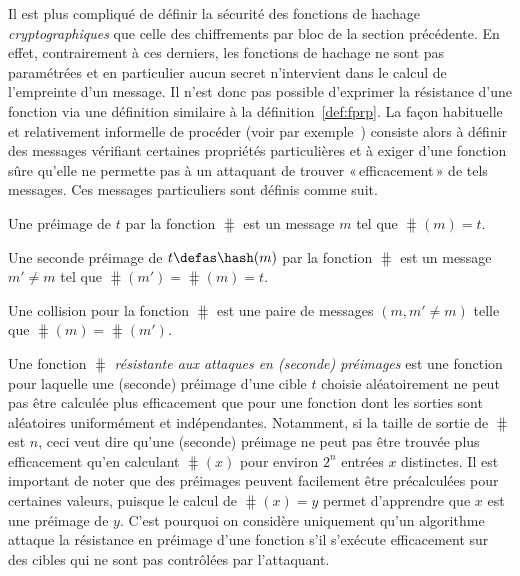 

Il est plus compliqué de définir la sécurité des fonctions de hachage \emph{cryptographiques} que celle des chiffrements par bloc de la section
précédente.
En effet, contrairement à ces derniers, les fonctions de hachage ne sont pas paramétrées et en particulier aucun secret n'intervient
dans le calcul de l'empreinte d'un message. Il n'est donc pas possible d'exprimer la résistance d'une fonction via une définition
similaire à la définition~\ref{def:fprp}. La façon habituelle et relativement informelle de procéder (voir par exemple~\cite[Chapitre 9]{HAC96})
consiste alors à définir des messages vérifiant certaines
propriétés particulières et à exiger d'une fonction sûre qu'elle ne permette pas à un attaquant de trouver «\,efficacement\,» de tels messages. Ces
messages particuliers sont définis comme suit.

\begin{fdefi}[Préimage]
Une préimage de $t$ par la fonction $\hash$ est un message $m$ tel que $\hash(m) = t$.
\end{fdefi}

\begin{fdefi}
Une seconde préimage de $t \defas \hash(m)$ par la fonction $\hash$ est un message $m' \neq m$ tel que $\hash(m') = \hash(m) = t$.
\end{fdefi}

\begin{fdefi}[Collision]
Une collision pour la fonction $\hash$ est une paire de messages $(m,m'\neq m)$ telle que $\hash(m) = \hash(m')$.
\end{fdefi}

Une fonction $\hash$ \emph{résistante aux attaques en (seconde) préimages} est une fonction pour laquelle une (seconde) préimage
d'une cible $t$ choisie aléatoirement ne peut pas être calculée plus efficacement que pour une fonction dont les
sorties sont aléatoires uniformément et indépendantes. Notamment, si la taille de sortie de $\hash$ est $n$, ceci veut dire qu'une (seconde) préimage
ne peut pas être trouvée plus efficacement qu'en calculant $\hash(x)$ pour environ $2^n$ entrées $x$ distinctes.
Il est important de noter que des préimages peuvent facilement être précalculées pour certaines valeurs, puisque le calcul
de $\hash(x) = y$ permet d'apprendre que $x$ est une préimage de $y$.
C'est pourquoi on considère uniquement qu'un algorithme attaque la résistance en préimage d'une
fonction s'il s'exécute efficacement sur des cibles qui ne sont pas contrôlées par l'attaquant.

